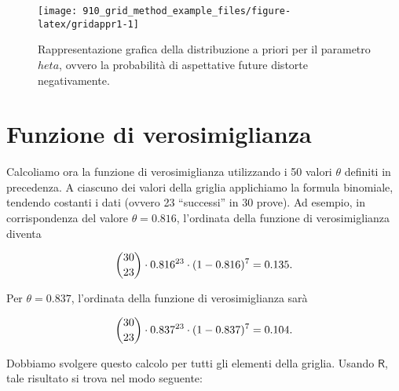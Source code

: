 \documentclass[
]{memoir}
\newcommand{\R}{\textsf{R}} %
\begin{document}
\begin{figure}

{\centering \texttt{[image: 910\_grid\_method\_example\_files/figure-latex/gridappr1-1]} 

}

\caption{Rappresentazione grafica della distribuzione a priori per il parametro $   heta$, ovvero la probabilità di aspettative future distorte negativamente.}\label{fig:gridappr1}
\end{figure}

\hypertarget{funzione-di-verosimiglianza}{%
\section{Funzione di verosimiglianza}\label{funzione-di-verosimiglianza}}

Calcoliamo ora la funzione di verosimiglianza utilizzando i 50 valori \(\theta\) definiti in precedenza. A ciascuno dei valori della griglia applichiamo la formula binomiale, tendendo costanti i dati (ovvero 23 ``successi'' in 30 prove). Ad esempio, in corrispondenza del valore \(\theta = 0.816\), l'ordinata della funzione di verosimiglianza diventa

\begin{equation}
\binom{30}{23} \cdot 0.816^{23} \cdot (1 - 0.816)^{7} = 0.135.\notag
\end{equation}

\noindent
Per \(\theta = 0.837\), l'ordinata della funzione di verosimiglianza sarà

\begin{equation}
\binom{30}{23} \cdot 0.837^{23} \cdot (1 - 0.837)^{7} = 0.104.\notag
\end{equation}

\noindent
Dobbiamo svolgere questo calcolo per tutti gli elementi della griglia. Usando \(\R\), tale risultato si trova nel modo seguente:
\end{document}
